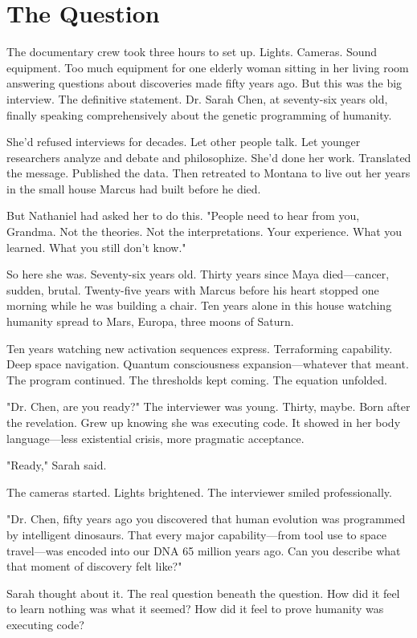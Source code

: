 \chapter{The Question}
\label{ch:32}


The documentary crew took three hours to set up. Lights. Cameras. Sound equipment. Too much equipment for one elderly woman sitting in her living room answering questions about discoveries made fifty years ago. But this was the big interview. The definitive statement. Dr. Sarah Chen, at seventy-six years old, finally speaking comprehensively about the genetic programming of humanity.

She'd refused interviews for decades. Let other people talk. Let younger researchers analyze and debate and philosophize. She'd done her work. Translated the message. Published the data. Then retreated to Montana to live out her years in the small house Marcus had built before he died.

But Nathaniel had asked her to do this. "People need to hear from you, Grandma. Not the theories. Not the interpretations. Your experience. What you learned. What you still don't know."

So here she was. Seventy-six years old. Thirty years since Maya died—cancer, sudden, brutal. Twenty-five years with Marcus before his heart stopped one morning while he was building a chair. Ten years alone in this house watching humanity spread to Mars, Europa, three moons of Saturn.

Ten years watching new activation sequences express. Terraforming capability. Deep space navigation. Quantum consciousness expansion—whatever that meant. The program continued. The thresholds kept coming. The equation unfolded.

"Dr. Chen, are you ready?" The interviewer was young. Thirty, maybe. Born after the revelation. Grew up knowing she was executing code. It showed in her body language—less existential crisis, more pragmatic acceptance.

"Ready," Sarah said.

The cameras started. Lights brightened. The interviewer smiled professionally.

"Dr. Chen, fifty years ago you discovered that human evolution was programmed by intelligent dinosaurs. That every major capability—from tool use to space travel—was encoded into our DNA 65 million years ago. Can you describe what that moment of discovery felt like?"

Sarah thought about it. The real question beneath the question. How did it feel to learn nothing was what it seemed? How did it feel to prove humanity was executing code?

